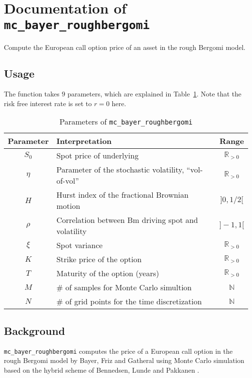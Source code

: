 \documentclass[a4paper]{article}
\newcommand{\R}{\mathbb{R}}
\begin{document}
\section*{Documentation of \texttt{mc\_bayer\_roughbergomi}}
\label{sec:techn-docum-verbmc_b}

Compute the European call option price of an asset in the rough Bergomi model.

\subsection*{Usage}
\label{sec:usage}

The function takes $9$ parameters, which are explained in
Table~\ref{tab:par}. Note that the risk free interest rate is set to $r = 0$ here.

\begin{table}[!htp]
  \centering
  \begin{tabular}{c|l|c}
    Parameter & Interpretation & Range \\
    \hline
    $S_0$ & Spot price of underlying & $\R_{>0}$\\
    $\eta$ & Parameter of the stochastic volatility, ``vol-of-vol'' & $\R_{>0}$\\
    $H$ & Hurst index of the fractional Brownian motion & $]0,1/2[$\\
    $\rho$ & Correlation between Bm driving spot and volatility & $]-1,1[$\\
    $\xi$ & Spot variance & $\R_{>0}$\\
    $K$ & Strike price of the option & $\R_{>0}$\\
    $T$ & Maturity of the option (years) & $\R_{>0}$\\
    $M$ & \# of samples for Monte Carlo simultion & $\mathbb{N}$\\
    $N$ & \# of grid points for the time discretization & $\mathbb{N}$
  \end{tabular}
  \caption{Parameters of \texttt{mc\_bayer\_roughbergomi}}
  \label{tab:par}
\end{table}

\subsection*{Background}
\label{sec:background}

\texttt{mc\_bayer\_roughbergomi} computes the price of a European call option in
the rough Bergomi model by Bayer, Friz and Gatheral \cite{BFG} using Monte Carlo
simulation based on the hybrid scheme of Bennedsen, Lunde and Pakkanen \cite{BLP}.
\end{document}
